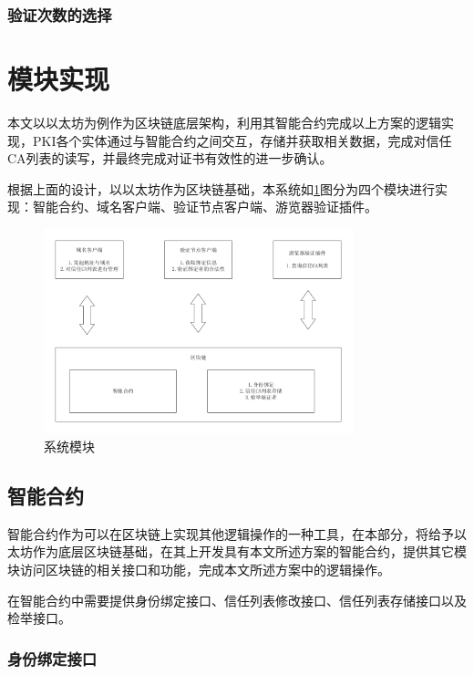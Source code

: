 \subsubsection{验证次数的选择}






\section{模块实现}

本文以以太坊为例作为区块链底层架构，利用其智能合约完成以上方案的逻辑实现，PKI各个实体通过与智能合约之间交互，存储并获取相关数据，完成对信任CA列表的读写，并最终完成对证书有效性的进一步确认。

根据上面的设计，以以太坊作为区块链基础，本系统如\ref{fig:module}图分为四个模块进行实现：智能合约、域名客户端、验证节点客户端、游览器验证插件。

\begin{figure}[htbp]
 	\centering
 	\includegraphics[width = 0.8\textwidth]{img/module}
 	\caption{系统模块}\label{fig:module}
\end{figure}

\subsection{智能合约}

智能合约作为可以在区块链上实现其他逻辑操作的一种工具，在本部分，将给予以太坊作为底层区块链基础，在其上开发具有本文所述方案的智能合约，提供其它模块访问区块链的相关接口和功能，完成本文所述方案中的逻辑操作。

在智能合约中需要提供身份绑定接口、信任列表修改接口、信任列表存储接口以及检举接口。

\subsubsection{身份绑定接口}

